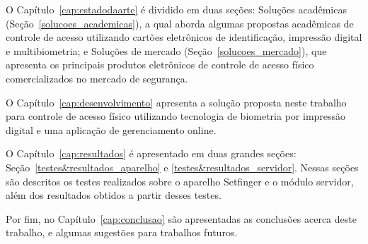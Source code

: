 O Capítulo~\ref{cap:estadodaarte} é dividido em duas seções: Soluções acadêmicas (Seção~\ref{solucoes_academicas}), a qual aborda algumas propostas acadêmicas de controle de acesso utilizando cartões eletrônicos de identificação, impressão digital e multibiometria; e Soluções de mercado (Seção~\ref{solucoes_mercado}), que apresenta os principais produtos eletrônicos de controle de acesso físico comercializados no mercado de segurança.


O Capítulo~\ref{cap:desenvolvimento} apresenta a solução proposta neste trabalho para controle de acesso físico utilizando tecnologia de biometria por impressão digital e uma aplicação de gerenciamento online.

O Capítulo~\ref{cap:resultados} é apresentado em duas grandes seções: Seção~\ref{testes&resultados_aparelho} e \ref{testes&resultados_servidor}. Nessas seções são descritos os testes realizados sobre o aparelho Setfinger e o módulo servidor, além dos resultados obtidos a partir desses testes.

Por fim, no Capítulo~\ref{cap:conclusao} são apresentadas as conclusões acerca deste trabalho, e algumas sugestões para trabalhos futuros.



